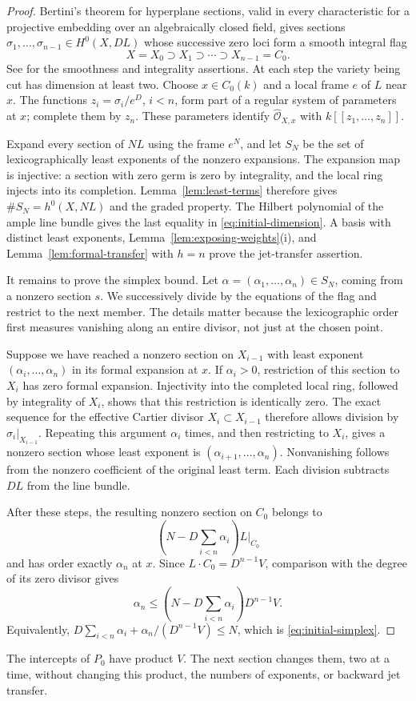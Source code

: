 \begin{proof}
Bertini's theorem for hyperplane sections, valid in every characteristic
for a projective embedding over an algebraically closed field, gives
sections $\sigma_1,\ldots,\sigma_{n-1}\in H^0(X,DL)$ whose successive
zero loci form a smooth integral flag
\[
 X=X_0\supset X_1\supset\cdots\supset X_{n-1}=C_0.
\]
See \cite[Tags~0FD6 and~0G4G]{StacksProject} for the smoothness and
integrality assertions.
At each step the variety being cut has dimension at least two.  Choose
$x\in C_0(k)$ and a local frame $e$ of $L$ near $x$.  The functions
$z_i=\sigma_i/e^D$, $i<n$, form part of a regular system of parameters
at $x$; complete them by $z_n$.  These parameters identify
$\widehat{\mathcal O}_{X,x}$ with $k[[z_1,\ldots,z_n]]$.

Expand every section of $NL$ using the frame $e^N$, and let $S_N$ be
the set of lexicographically least exponents of the nonzero expansions.
The expansion map is injective: a section with zero germ is zero by
integrality, and the local ring injects into its completion.
Lemma~\ref{lem:least-terms} therefore gives
$\#S_N=h^0(X,NL)$ and the graded property.  The Hilbert polynomial of
the ample line bundle gives the last equality in
\eqref{eq:initial-dimension}.  A basis with distinct least exponents,
Lemma~\ref{lem:exposing-weights}(i), and
Lemma~\ref{lem:formal-transfer} with $h=n$ prove the jet-transfer
assertion.

It remains to prove the simplex bound.  Let
$\alpha=(\alpha_1,\ldots,\alpha_n)\in S_N$, coming from a nonzero
section $s$.  We successively divide by the equations of the flag and
restrict to the next member.  The details matter because the
lexicographic order first measures vanishing along an entire divisor,
not just at the chosen point.

Suppose we have reached a nonzero section on $X_{i-1}$ with least
exponent $(\alpha_i,\ldots,\alpha_n)$ in its formal expansion at $x$.
If $\alpha_i>0$, restriction of this section to $X_i$ has zero formal
expansion.  Injectivity into the completed local ring, followed by
integrality of $X_i$, shows that this restriction is identically zero.
The exact sequence for the effective Cartier divisor
$X_i\subset X_{i-1}$ therefore allows division by
$\sigma_i|_{X_{i-1}}$.  Repeating this argument $\alpha_i$ times, and
then restricting to $X_i$, gives a nonzero section whose least exponent
is $(\alpha_{i+1},\ldots,\alpha_n)$.  Nonvanishing follows from the
nonzero coefficient of the original least term.  Each division
subtracts $DL$ from the line bundle.

After these steps, the resulting nonzero section on $C_0$ belongs to
\[
 \left(N-D\sum_{i<n}\alpha_i\right)L|_{C_0}
\]
and has order exactly $\alpha_n$ at $x$.  Since
$L\cdot C_0=D^{n-1}V$, comparison with the degree of its zero divisor
gives
\[
 \alpha_n\leq
 \left(N-D\sum_{i<n}\alpha_i\right)D^{n-1}V.
\]
Equivalently,
$D\sum_{i<n}\alpha_i+\alpha_n/(D^{n-1}V)\leq N$, which is
\eqref{eq:initial-simplex}.
\end{proof}

The intercepts of $P_0$ have product $V$.  The next section changes
them, two at a time, without changing this product, the numbers of
exponents, or backward jet transfer.
